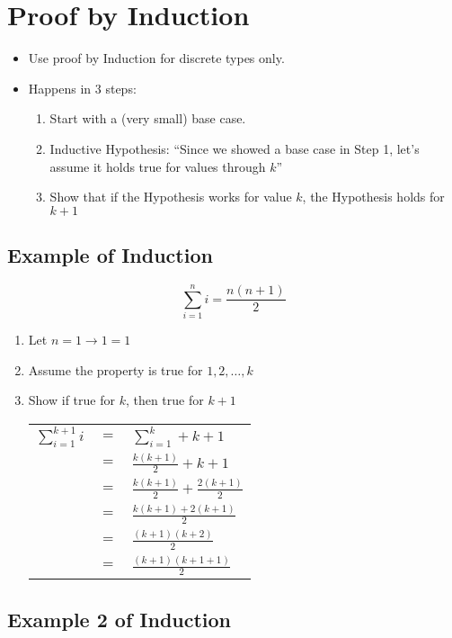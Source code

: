 \documentclass[12pt]{article}
\begin{document}
\section*{Proof by Induction}
\begin{itemize}
    \item Use proof by Induction for discrete types only.
    \item Happens in 3 steps:
    \begin{enumerate}
        \item Start with a (very small) base case.
        \item Inductive Hypothesis: ``Since we showed a base case in Step 1, let's assume it holds true for values through $k$''
        \item Show that if the Hypothesis works for value $k$, the Hypothesis holds for $k+1$
    \end{enumerate}
\end{itemize}

\subsection*{Example of Induction}

\[ \sum_{i=1}^{n} i = \frac{n(n+1)}{2} \]

\begin{enumerate}
    \item Let $n=1 \rightarrow 1 = 1$
    \item Assume the property is true for $1, 2, \ldots, k$
    \item Show if true for $k$, then true for $k+1$
    \\
    \begin{tabular}{l l l}
        $\sum_{i=1}^{k+1} i$ & $=$ & $\sum_{i=1}^{k} + k + 1$ \\
        & $=$ & $\frac{k(k+1)}{2} + k + 1$ \\
        & $=$ & $\frac{k(k+1)}{2} + \frac{2(k+1)}{2}$ \\
        & $=$ & $\frac{k(k+1) + 2(k+1)}{2}$ \\
        & $=$ & $\frac{(k+1)(k+2)}{2}$ \\
        & $=$ & $\frac{(k+1)(k+1+1)}{2}$ \\
    \end{tabular}


\end{enumerate}

\pagebreak

\subsection*{Example 2 of Induction}
\end{document}
